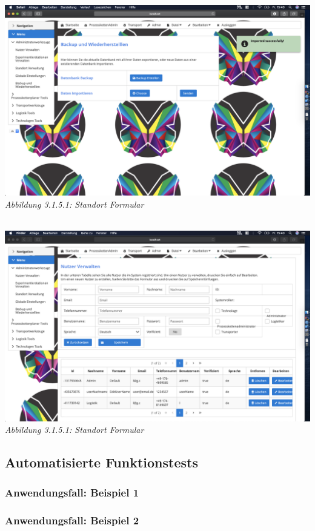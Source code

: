\documentclass[enabledeprecatedfontcommands,fontsize=12pt,paper=a4,twoside]{scrartcl}
\begin{document}
\hypertarget{sc3.1.5.1}{
\includegraphics[width=1\textwidth]{Screenshots/5BackImported.png}
\textit{Abbildung 3.1.5.1: Standort Formular}
} \\

\hypertarget{sc3.1.5.1}{
\includegraphics[width=1\textwidth]{Screenshots/5AddUsers.png}
\textit{Abbildung 3.1.5.1: Standort Formular}
} \\

\subsection{Automatisierte Funktionstests}

\subsubsection{Anwendungsfall: Beispiel 1}


\subsubsection{Anwendungsfall: Beispiel 2}
\end{document}
